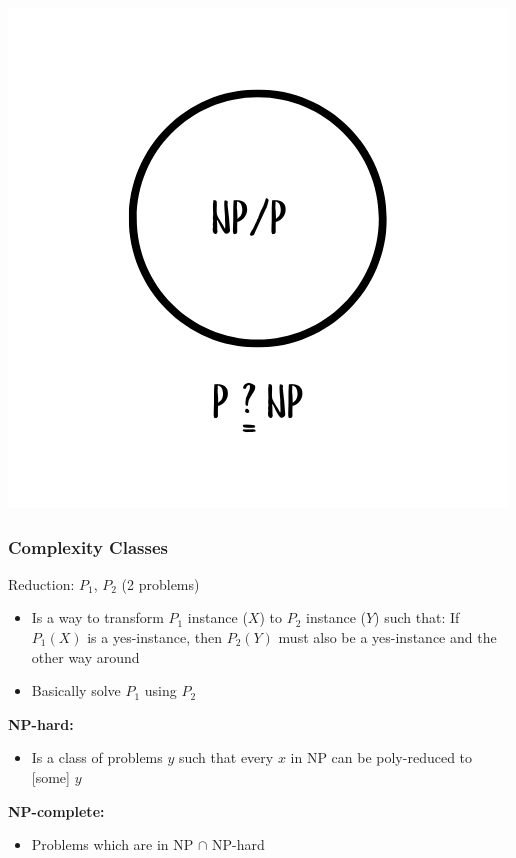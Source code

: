 \begin{frame}
\begin{minipage}{0.48\textwidth}
    \includegraphics[width=\linewidth]{figures/lec/np2.png} 
  \end{minipage}
\end{frame}

\begin{frame}
  \frametitle{Complexity Classes}


  \begin{block}{Reduction: $P_1$, $P_2$ (2 problems)}
    \begin{itemize}
        \item Is a way to transform $P_1$ instance ($X$) to $P_2$ instance ($Y$) such that:
             If $P_1(X)$ is a yes-instance, then $P_2(Y)$ must also be a yes-instance and the other way around
        \item Basically solve $P_1$ using $P_2$
    \end{itemize}
  \end{block}
  
        \vspace{0.3cm}
  \textbf{NP-hard:}
  \begin{itemize}
      \item Is a class of problems $y$ such that every $x$ in NP can be poly-reduced to [some] $y$
  \end{itemize}
      \vspace{0.3cm}
  \textbf{NP-complete:}
  \begin{itemize}
      \item Problems which are in NP $\cap$ NP-hard
  \end{itemize}
\end{frame}


